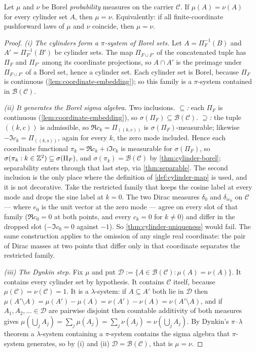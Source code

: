 \begin{theorem}\label{thm:cylinder-uniqueness}
Let $\mu$ and $\nu$ be Borel \emph{probability} measures on the carrier
$\mathcal C$. If $\mu(A)=\nu(A)$ for every cylinder set $A$, then $\mu=\nu$.
Equivalently: if all finite-coordinate pushforward laws of $\mu$ and $\nu$
coincide, then $\mu=\nu$.
\end{theorem}

\begin{proof}
\emph{(i) The cylinders form a $\pi$-system of Borel sets.} Let
$A=\Pi_F^{-1}(B)$ and $A'=\Pi_{F'}^{-1}(B')$ be cylinder sets. The map
$\Pi_{F\cup F'}$ of the concatenated tuple has $\Pi_F$ and $\Pi_{F'}$ among its
coordinate projections, so $A\cap A'$ is the preimage under $\Pi_{F\cup F'}$ of
a Borel set, hence a cylinder set. Each cylinder set is Borel, because $\Pi_F$ is
continuous (\cref{lem:coordinate-embedding}); so this family is a $\pi$-system
contained in $\mathcal B(\mathcal C)$.

\emph{(ii) It generates the Borel sigma algebra.} Two inclusions.
\emph{$\subseteq$:} each $\Pi_F$ is continuous (\cref{lem:coordinate-embedding}), so
$\sigma(\Pi_F)\subseteq\mathcal B(\mathcal C)$.
\emph{$\supseteq$:} the tuple $((k,\mathrm c))$ is admissible, so
$\Re c_k=\Pi_{((k,\mathrm c))}$ is $\sigma(\Pi_F)$-measurable; likewise
$-\Im c_k=\Pi_{((k,\mathrm s))}$, again for every $k$, the zero mode included.
Hence each coordinate functional $\pi_k=\Re c_k+i\Im c_k$ is measurable for
$\sigma(\Pi_F)$, so $\sigma(\pi_k:k\in\mathbb{Z}^2)\subseteq\sigma(\Pi_F)$, and
$\sigma(\pi_k)=\mathcal B(\mathcal C)$ by \cref{thm:cylinder-borel}; separability
enters through that last step, via \cref{thm:separable}.
The second inclusion is the only place where the definition of
\cref{def:cylinder-map} is used, and it is not decorative. Take the restricted
family that keeps the cosine label at every mode and drops the sine label at
$k=0$. The two Dirac measures $\delta_{0}$ and $\delta_{ie_0}$ on
$\mathcal C$ --- where $e_0$ is the unit vector at the zero mode --- agree on
every slot of that family ($\Re c_0=0$ at both points, and every $c_k=0$ for
$k\ne0$) and differ in the dropped slot ($-\Im c_0=0$ against $-1$). So
\cref{thm:cylinder-uniqueness} would fail. The same construction applies to the
omission of any single real coordinate: the pair of Dirac masses at two points
that differ only in that coordinate separates the restricted family.

\emph{(iii) The Dynkin step.} Fix $\mu$ and put
$\mathcal D:=\{A\in\mathcal B(\mathcal C):\mu(A)=\nu(A)\}$. It contains every
cylinder set by hypothesis. It contains $\mathcal C$ itself, because
$\mu(\mathcal C)=\nu(\mathcal C)=1$. It is a $\lambda$-system: if $A\subseteq A'$
both lie in $\mathcal D$ then
$\mu(A'\setminus A)=\mu(A')-\mu(A)=\nu(A')-\nu(A)=\nu(A'\setminus A)$, and if
$A_1,A_2,\dots\in\mathcal D$ are pairwise disjoint then countable additivity of
both measures gives
$\mu(\bigcup_jA_j)=\sum_j\mu(A_j)=\sum_j\nu(A_j)=\nu(\bigcup_jA_j)$. By Dynkin's
$\pi$--$\lambda$ theorem a $\lambda$-system containing a $\pi$-system contains
the sigma algebra that $\pi$-system generates, so by (i) and (ii)
$\mathcal D=\mathcal B(\mathcal C)$, that is $\mu=\nu$.


\end{proof}
